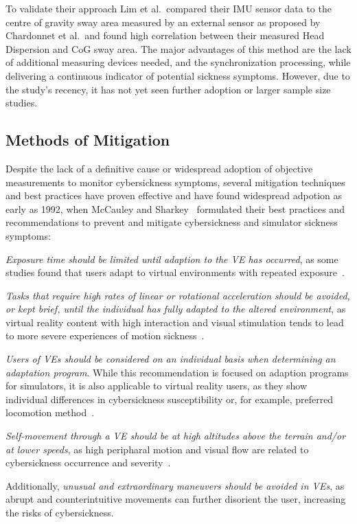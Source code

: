 To validate their approach Lim et al.\ compared their IMU sensor data to the centre of gravity sway area measured by an
external sensor as proposed by Chardonnet et al.\ and found high correlation between their measured Head Dispersion
and CoG sway area.
The major advantages of this method are the lack of additional measuring devices needed, and the synchronization
processing, while delivering a continuous indicator of potential sickness symptoms.
However, due to the study's recency, it has not yet seen further adoption or larger sample size studies.


\subsection{Methods of Mitigation}\label{subsec:methods-of-mitigation}

Despite the lack of a definitive cause or widespread adoption of objective measurements to monitor cybersickness
symptoms, several mitigation techniques and best practices have proven effective and have found widespread adpotion
as early as 1992, when McCauley and Sharkey~\cite{McCauley1992} formulated their best practices and recommendations
to prevent and mitigate cybersickness and simulator sickness symptoms:

\textit{Exposure time should be limited until adaption to the VE has occurred}, as some studies found that users
adapt to virtual environments with repeated exposure~\cite{Hill2000}.

\textit{Tasks that require high rates of linear or rotational acceleration should be avoided, or kept brief, until the
individual has fully adapted to the altered environment}, as virtual reality content with high interaction and visual
stimulation tends to lead to more severe experiences of motion sickness~\cite{Saredakis2020}.

\textit{Users of VEs should be considered on an individual basis when determining an adaptation program}.
While this recommendation is focused on adaption programs for simulators, it is also applicable to virtual reality
users, as they show individual differences in cybersickness susceptibility or, for example, preferred locomotion 
method~\cite{Clifton2020}.

\textit{Self-movement through a VE should be at high altitudes above the terrain and/or at lower speeds}, as high
peripharal motion and visual flow are related to cybersickness occurrence and severity~\cite{Buhler2018}.

Additionally, \textit{unusual and extraordinary maneuvers should be avoided in VEs}, as abrupt and counterintuitive
movements can further disorient the user, increasing the risks of cybersickness.

